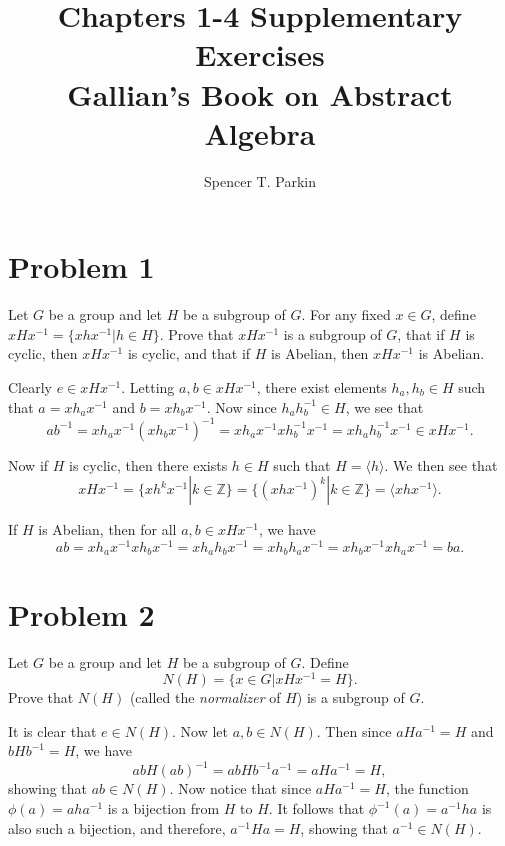 \documentclass[12pt]{article}
\title{Chapters 1-4 Supplementary Exercises\\Gallian's Book on Abstract Algebra}
\author{Spencer T. Parkin}
\newcommand{\Z}{\mathbb{Z}}
\begin{document}
\maketitle

\section*{Problem 1}

Let $G$ be a group and let $H$ be a subgroup of $G$.  For any fixed $x\in G$,
define $xHx^{-1}=\{xhx^{-1}|h\in H\}$.  Prove that $xHx^{-1}$ is a subgroup of $G$,
that if $H$ is cyclic, then $xHx^{-1}$ is cyclic, and that if $H$ is Abelian, then $xHx^{-1}$ is Abelian.

Clearly $e\in xHx^{-1}$.  Letting $a,b\in xHx^{-1}$, there exist elements $h_a,h_b\in H$
such that $a=xh_ax^{-1}$ and $b=xh_bx^{-1}$.  Now since $h_ah_b^{-1}\in H$,
we see that
\begin{equation*}
ab^{-1}=xh_ax^{-1}(xh_bx^{-1})^{-1}=xh_ax^{-1}xh_b^{-1}x^{-1}=xh_ah_b^{-1}x^{-1}\in xHx^{-1}.
\end{equation*}

Now if $H$ is cyclic, then there exists $h\in H$ such that $H=\langle h\rangle$.
We then see that
\begin{equation*}
xHx^{-1}=\{xh^kx^{-1}|k\in\Z\}=\{(xhx^{-1})^k|k\in\Z\} = \langle xhx^{-1}\rangle.
\end{equation*}

If $H$ is Abelian, then for all $a,b\in xHx^{-1}$, we have
\begin{equation*}
ab = xh_ax^{-1}xh_bx^{-1}=xh_ah_bx^{-1}=xh_bh_ax^{-1}=xh_bx^{-1}xh_ax^{-1}=ba.
\end{equation*}

\section*{Problem 2}

Let $G$ be a group and let $H$ be a subgroup of $G$.  Define
\begin{equation*}
N(H)=\{x\in G|xHx^{-1}=H\}.
\end{equation*}
Prove that $N(H)$ (called the {\it normalizer} of $H$) is a subgroup of $G$.

It is clear that $e\in N(H)$.  Now let $a,b\in N(H)$.
Then since $aHa^{-1}=H$ and $bHb^{-1}=H$, we have
\begin{equation*}
abH(ab)^{-1}=abHb^{-1}a^{-1}=aHa^{-1}=H,
\end{equation*}
showing that $ab\in N(H)$.  Now notice that since $aHa^{-1}=H$,
the function $\phi(a)=aha^{-1}$ is a bijection from $H$ to $H$.
It follows that $\phi^{-1}(a)=a^{-1}ha$ is also such a bijection,
and therefore, $a^{-1}Ha=H$, showing that $a^{-1}\in N(H)$.
\end{document}
